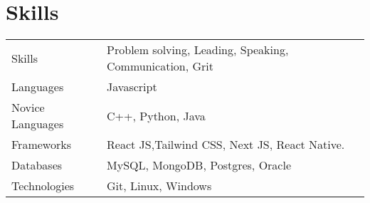 \documentclass[a4paper,12pt]{article}
\begin{document}
\section{Skills}
\begin{tabularx}{\linewidth}{@{}l X@{}}
Skills &  \normalsize{Problem solving, Leading, Speaking, Communication, Grit}\\
Languages  &  \normalsize{Javascript}\\  
Novice Languages   &  \normalsize{C++, Python, Java}\\  

Frameworks  &  \normalsize{React JS,Tailwind CSS, Next JS, React Native.}\\  
Databases  &  \normalsize{MySQL, MongoDB, Postgres, Oracle}\\  
Technologies  &  \normalsize{Git, Linux, Windows}\\  

\end{tabularx}
\end{document}
